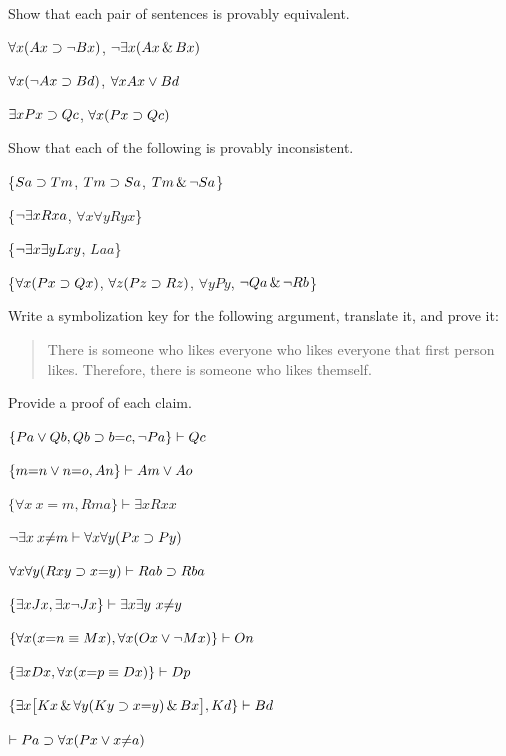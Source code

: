 \problempart
Show that each pair of sentences is provably equivalent.
\begin{earg}
\item $\forall x (Ax\supset \neg Bx)$, $\neg\exists x(Ax \,\&\, Bx)$
\item $\forall x (\neg Ax\supset Bd)$, $\forall x Ax \vee Bd$
\item $\exists x Px \supset Qc$, $\forall x (Px \supset Qc)$
\end{earg}



\problempart
Show that each of the following is provably inconsistent.
\begin{earg}
\item \{$Sa\supset Tm$, $Tm \supset Sa$, $Tm \,\&\, \neg Sa$\}
\item \{$\neg\exists x Rxa$, $\forall x \forall y Ryx$\}
\item \{$\neg\exists x \exists y Lxy$, $Laa$\}
\item \{$\forall x(Px \supset Qx)$, $\forall z(Pz \supset Rz)$, $\forall y Py$, $\neg Qa \,\&\, \neg Rb$\}
\end{earg}



\solutions
\problempart
\label{pr.likes}
Write a symbolization key for the following argument, translate it, and prove it:
\begin{quote}
There is someone who likes everyone who likes everyone that first person likes. Therefore, there is someone who likes themself.
\end{quote}

\problempart
\label{pr.identity}
Provide a proof of each claim.
\begin{earg}
\item $\{Pa \vee Qb, Qb \supset b{=}c, \neg Pa\}\vdash Qc$
\item $\{m{=}n \vee n{=}o, An\}\vdash Am \vee Ao$
\item $\{\forall x \: x{=}m, Rma\}\vdash \exists x Rxx$
\item $\neg \exists x \: x {\neq} m \vdash \forall x\forall y (Px \supset Py)$
\item $\forall x\forall y(Rxy \supset x{=}y)\vdash Rab \supset Rba$
\item $\{\exists x Jx, \exists x \neg Jx\}\vdash \exists x \exists y\ x{\neq} y$
\item $\{\forall x(x{=}n \equiv Mx), \forall x(Ox \vee \neg Mx)\}\vdash On$
\item $\{\exists x Dx, \forall x(x{=}p \equiv Dx)\}\vdash Dp$
\item $\{\exists x\bigl[Kx \,\&\, \forall y(Ky \supset x{=}y) \,\&\, Bx\bigr], Kd\}\vdash Bd$
\item $\vdash Pa \supset \forall x(Px \vee x {\neq} a)$
\end{earg}



